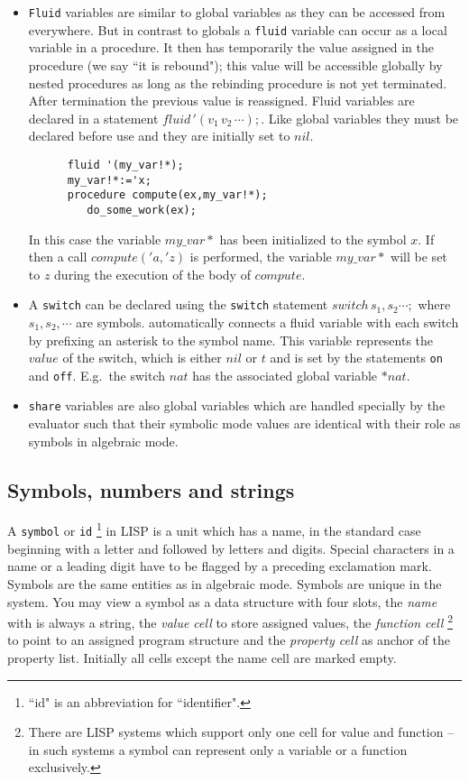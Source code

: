 \begin{itemize}
\item {\tt Fluid} variables are similar to global
 variables as they can be accessed from everywhere. But
 in contrast to globals a {\tt fluid} variable can occur as a local 
 variable in a procedure. It then has temporarily the value
 assigned in the procedure (we say ``it is rebound");
 this value will be accessible globally by nested procedures
 as long as the rebinding procedure is not yet terminated.
 After termination the previous value is reassigned.
 Fluid variables are declared in a statement
 $fluid\,'(v_1\,v_2\,\cdots);$. Like global variables they
 must be declared before use and they are initially set to $nil$.
\begin{verbatim}
      fluid '(my_var!*);
      my_var!*:='x;
      procedure compute(ex,my_var!*);
         do_some_work(ex);
\end{verbatim}
 In this case the variable $my\_var*$ has been initialized
to the symbol $x$. If then a call $compute('a,'z)$ is
performed, the variable $my\_var*$ will be set to $z$
during the execution of the body of $compute$.

\item A {\tt switch} can be declared using the
 {\tt switch} statement $switch\,s_1,s_2\cdots;$ where
 $s_1,s_2,\cdots$ are symbols. {\reduce}
 automatically connects a fluid variable with each switch
 by prefixing an asterisk to the symbol name. This variable
 represents the $value$ of the switch, which is either
 $nil$ or $t$ and is set by the statements {\tt on} and 
 {\tt off}.
 E.g.\ the switch $nat$ has the associated global variable
 $*nat$. 
\item {\tt share} variables are also global variables
 which are handled specially by the {\reduce} evaluator
 such that their symbolic mode values are identical with their 
 role as symbols in algebraic mode.
\end{itemize}

\subsection{Symbols, numbers and strings}

A {\tt symbol} or {\tt id} 
\footnote{``id" is an abbreviation for ``identifier".} 
in LISP is a unit which has a name, in the standard
case beginning with a letter and followed by letters and digits.
Special characters in a name or a leading digit have to be
flagged by a preceding exclamation mark. Symbols are the same
entities as in algebraic mode. Symbols 
are unique in the system. You may view a symbol as a data
structure with four slots, the {\it name} with is always a string, 
the {\it value cell} to store assigned values, 
the {\it function cell}
\footnote{There are LISP systems which support only one cell
for value and function -- in such systems a symbol can represent
only a variable or a function exclusively.} 
to point to an assigned program structure
and the {\it property cell} as anchor of the property list.
Initially all cells except the name cell are marked empty.


